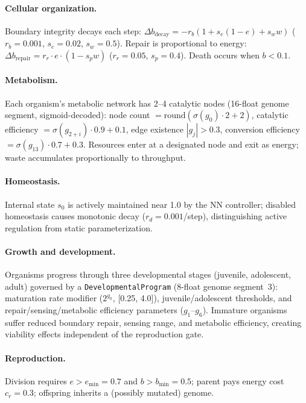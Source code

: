 \documentclass[letterpaper]{article}
\begin{document}
\paragraph{Cellular organization.}
Boundary integrity decays each step:
$\Delta b_{\text{decay}} = -r_b(1 + s_e(1-e) + s_w w)$
($r_b{=}0.001$, $s_e{=}0.02$, $s_w{=}0.5$).
Repair is proportional to energy:
$\Delta b_{\text{repair}} = r_r \cdot e \cdot (1 - s_p w)$
($r_r{=}0.05$, $s_p{=}0.4$). Death occurs when $b < 0.1$.

\paragraph{Metabolism.}
Each organism's metabolic network has 2--4 catalytic nodes (16-float genome
segment, sigmoid-decoded): node count $= \text{round}(\sigma(g_0){\cdot}2{+}2)$,
catalytic efficiency $= \sigma(g_{2+i}){\cdot}0.9{+}0.1$, edge existence
$|g_j|{>}0.3$, conversion efficiency $= \sigma(g_{13}){\cdot}0.7{+}0.3$.
Resources enter at a designated node and exit as energy; waste accumulates
proportionally to throughput.

\paragraph{Homeostasis.}
Internal state $s_0$ is actively maintained near 1.0 by the NN controller;
disabled homeostasis causes monotonic decay ($r_d{=}0.001$/step), distinguishing
active regulation from static parameterization.

\paragraph{Growth and development.}
Organisms progress through three developmental stages (juvenile, adolescent,
adult) governed by a \texttt{DevelopmentalProgram} (8-float genome segment~3):
maturation rate modifier ($2^{g_0}$, [0.25, 4.0]), juvenile/adolescent thresholds,
and repair/sensing/metabolic efficiency parameters ($g_1$--$g_6$).
Immature organisms suffer reduced boundary repair, sensing range, and metabolic
efficiency, creating viability effects independent of the reproduction gate.

\paragraph{Reproduction.}
Division requires $e > e_{\min}{=}0.7$ and $b > b_{\min}{=}0.5$; parent pays
energy cost $c_r{=}0.3$; offspring inherits a (possibly mutated) genome.
\end{document}
